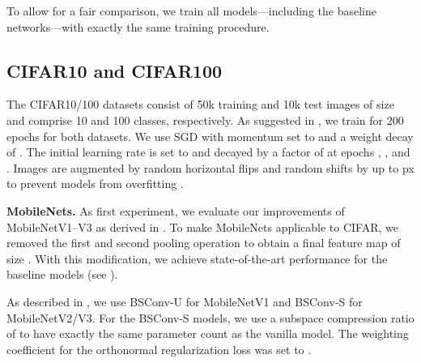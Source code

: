\documentclass[10pt,twocolumn,letterpaper]{article}
\newcommand{\DCCK}{BSConv\xspace}
\newcommand{\DCCKU}{\DCCK-U\xspace}
\newcommand{\DCCKS}{\DCCK-S\xspace}
\begin{document}
To allow for a fair comparison, we train all models---including the baseline networks---with exactly the same training procedure.

\subsection{CIFAR10 and CIFAR100}
The CIFAR10/100 datasets \cite{krizhevsky2009learning} consist of 50k training and 10k test images of size  and comprise 10 and 100 classes, respectively.
As suggested in \cite{he2016deep,zagoruyko2016wide}, we train for 200 epochs for both datasets.
We use SGD with momentum set to  and a weight decay of .
The initial learning rate is set to  and decayed by a factor of  at epochs , , and .
Images are augmented by random horizontal flips and random shifts by up to  px to prevent models from overfitting \cite{he2016deep, zagoruyko2016wide}.

\textbf{MobileNets.}
As first experiment, we evaluate our improvements of MobileNetV1--V3 \cite{howard2017mobilenets,sandler2018mobilenetv2,howard2019searching} as derived in .
To make MobileNets applicable to CIFAR, we removed the first and second pooling operation to obtain a final feature map of size .
With this modification, we achieve state-of-the-art performance for the baseline models (see ).

As described in , we use \DCCKU for \mbox{MobileNetV1} and \DCCKS for MobileNetV2/V3.
For the \DCCKS models, we use a subspace compression ratio of  to have exactly the same parameter count as the vanilla model.
The weighting coefficient  for the orthonormal regularization loss was set to .
\end{document}
